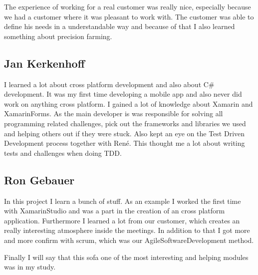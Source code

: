 The experience of working for a real customer was really nice, especially because we had a customer where it was pleasant to work with. The customer was able to define his needs in a understandable way and because of that I also learned something about precision farming.
\subsection{Jan Kerkenhoff}
I learned a lot about cross platform development and also about C\# development. It was my first time developing a mobile app and also never did work on anything cross platform. I gained a lot of knowledge about Xamarin and \gls{XamarinForms}.
As the main developer is was responsible for solving all programming related challenges, pick out the frameworks and libraries we used and helping others out if they were stuck. Also kept an eye on the Test Driven Development process together with René. This thought me a lot about writing tests and challenges when doing TDD.


\subsection{Ron Gebauer}

In this project I learn a bunch of stuff. As an example I worked the first time with \gls{XamarinStudio} and was a part in the creation of an cross platform application. Furthermore I learned a lot from our customer, which creates an really interesting atmosphere inside the meetings. In addition to that I got more and more confirm with \gls{scrum}, which was our \gls{AgileSoftwareDevelopment} method.		
		
Finally I will say that this \gls{sofa} one of the most interesting and helping modules was in my study.
